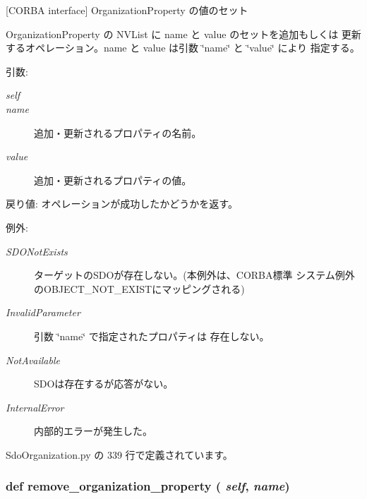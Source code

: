 [CORBA interface] OrganizationProperty の値のセット 

OrganizationProperty の NVList に name と value のセットを追加もしくは 更新するオペレーション。name と value は引数 \char`\"{}name\char`\"{} と \char`\"{}value\char`\"{} により 指定する。

\begin{Desc}
\item[引数:]
\begin{description}
\item[{\em self}]\item[{\em name}]追加・更新されるプロパティの名前。 \item[{\em value}]追加・更新されるプロパティの値。\end{description}
\end{Desc}
\begin{Desc}
\item[戻り値:]オペレーションが成功したかどうかを返す。\end{Desc}
\begin{Desc}
\item[例外:]
\begin{description}
\item[{\em SDONotExists}]ターゲットのSDOが存在しない。(本例外は、CORBA標準 システム例外のOBJECT\_\-NOT\_\-EXISTにマッピングされる) \item[{\em InvalidParameter}]引数 \char`\"{}name\char`\"{} で指定されたプロパティは 存在しない。 \item[{\em NotAvailable}]SDOは存在するが応答がない。 \item[{\em InternalError}]内部的エラーが発生した。 \end{description}
\end{Desc}


 SdoOrganization.py の 339 行で定義されています。
\subsubsection{\setlength{\rightskip}{0pt plus 5cm}def remove\_\-organization\_\-property ( {\em self},  {\em name})}\label{classsource__py_1_1_sdo_organization_1_1_organization__impl_d9f0f7a5c2eb19ea471eaa095bc2d64c}


